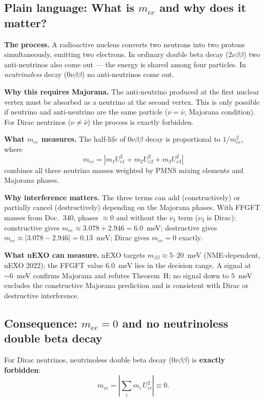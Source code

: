 \subsection*{Plain language: What is $m_{ee}$ and why does it matter?}

\textbf{The process.} A radioactive nucleus converts two neutrons into two protons
simultaneously, emitting two electrons. In ordinary double beta decay ($2\nu\beta\beta$)
two anti-neutrinos also come out --- the energy is shared among four particles.
In \emph{neutrinoless} decay ($0\nu\beta\beta$) no anti-neutrinos come out.

\textbf{Why this requires Majorana.} The anti-neutrino produced at the first
nuclear vertex must be absorbed as a neutrino at the second vertex. This is only
possible if neutrino and anti-neutrino are the same particle ($\nu = \bar\nu$,
Majorana condition). For Dirac neutrinos ($\nu \neq \bar\nu$) the process is
exactly forbidden.

\textbf{What $m_{ee}$ measures.} The half-life of $0\nu\beta\beta$ decay is
proportional to $1/m_{ee}^2$, where
\[
  m_{ee} = \left| m_1 U_{e1}^2 + m_2 U_{e2}^2 + m_3 U_{e3}^2 \right|
\]
combines all three neutrino masses weighted by PMNS mixing elements and Majorana phases.

\textbf{Why interference matters.} The three terms can add (constructively) or
partially cancel (destructively) depending on the Majorana phases. With FFGFT
masses from Doc.~340, phases $\approx 0$ and without the $\nu_3$ term ($\nu_3$ is Dirac):
constructive gives $m_{ee} \approx 3.078 + 2.946 = 6.0$~meV; destructive gives
$m_{ee} \approx |3.078 - 2.946| = 0.13$~meV; Dirac gives $m_{ee} = 0$ exactly.

\textbf{What nEXO can measure.} nEXO targets $m_{\beta\beta}\approx5$--$20$~meV (NME-dependent, nEXO 2022);
the FFGFT value 6.0~meV lies in the decision range. A signal at $\sim6$~meV confirms Majorana and refutes
Theorem~H; no signal down to $5$~meV excludes the constructive Majorana prediction
and is consistent with Dirac or destructive interference.

\subsection*{Consequence: $m_{ee}=0$ and no neutrinoless double beta decay}

For Dirac neutrinos, neutrinoless double beta decay ($0\nu\beta\beta$) is
\textbf{exactly forbidden}:
\[
  m_{ee} = \left|\sum_i m_i\,U_{ei}^2\right| \equiv 0.
\]

